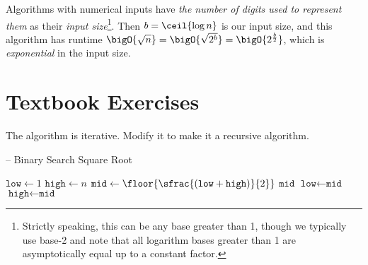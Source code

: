 \documentclass[draft]{article}
\begin{document}
\begin{solution}
    Algorithms with numerical inputs have \emph{the number of digits used to represent them} as their \emph{input size}\footnote{Strictly speaking, this can be any base greater than 1, though we typically use base-2 and note that all logarithm bases greater than 1 are asymptotically equal up to a constant factor.}. Then $b = \ceil{\log{n}}$ is our input size, and this algorithm has runtime $\bigO{\sqrt{n}} = \bigO{\sqrt{2^b}} = \bigO{2^{\frac{b}{2}}}$, which is \emph{exponential} in the input size.
\end{solution}

\section{Textbook Exercises}
\begin{exercise}{2.3}
    The algorithm  is iterative. Modify it to make it a recursive algorithm.

    \begin{algorithm}[H]
        \caption[]{ -- Binary Search Square Root}
        \label{alg:binsqrt}
        \begin{algorithmic}[1]
            \State $\texttt{low} \gets 1$   
            \State $\texttt{high} \gets n$  
            \While{\True}
            \State $\texttt{mid} \gets \floor{\sfrac{(\texttt{low} + \texttt{high})}{2}}$   
            \State \Return $\texttt{mid}$
             
            \State $\texttt{low} \gets \texttt{mid}$
            \Else {}
            \State $\texttt{high} \gets \texttt{mid}$
            \EndIf
            \EndWhile
            \EndFunction
        \end{algorithmic}
    \end{algorithm}
\end{exercise}
\end{document}
